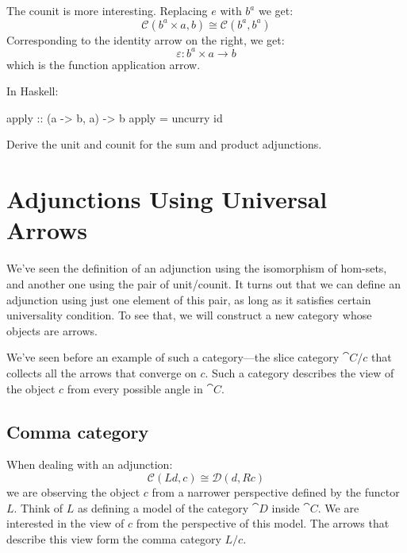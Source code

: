 \documentclass[DaoFP]{subfiles}
\begin{document}
The counit is more interesting. Replacing $e$ with $b^a$ we get:
\[  \mathcal{C}(b^a \times a, b ) \cong  \mathcal{C} (b^a, b^a)  \]
Corresponding to the identity arrow on the right, we get:
\[ \varepsilon \colon b^a \times a \to b \]
which is the function application arrow. 

In Haskell:
\begin{haskell}
apply :: (a -> b, a) -> b
apply = uncurry id
\end{haskell}

\begin{exercise}
Derive the unit and counit for the sum and product adjunctions.
\end{exercise}

\section{Adjunctions Using Universal Arrows}

We've seen the definition of an adjunction using the isomorphism of hom-sets, and another one using the pair of unit/counit. It turns out that we can define an adjunction using just one element of this pair, as long as it satisfies certain universality condition. To see that, we will construct a new category whose objects are arrows. 

We've seen before an example of such a category---the slice category $\cat C/ c$ that collects all the arrows that converge on $c$. Such a category describes the view of the object $c$ from every possible angle in $\cat C$. 

\subsection{Comma category}
When dealing with an adjunction:
\[  \mathcal{C} (L d, c) \cong \mathcal{D}( d , R c)\]
we are observing the object $c$ from a narrower perspective defined by the functor $L$. Think of $L$ as defining a model of the category $\cat D$ inside $\cat C$. We are interested in the view of $c$ from the perspective of this model. The arrows that describe this view form the comma category $L/c$.
\end{document}
